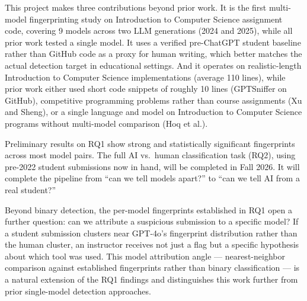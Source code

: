 \documentclass[sigconf]{acmart}
\begin{document}
This project makes three contributions beyond prior work. It is the first multi-model fingerprinting study on Introduction to Computer Science assignment code, covering 9 models across two LLM generations (2024 and 2025), while all prior work tested a single model. It uses a verified pre-ChatGPT student baseline rather than GitHub code as a proxy for human writing, which better matches the actual detection target in educational settings. And it operates on realistic-length Introduction to Computer Science implementations (average 110 lines), while prior work either used short code snippets of roughly 10 lines (GPTSniffer on GitHub), competitive programming problems rather than course assignments (Xu and Sheng), or a single language and model on Introduction to Computer Science programs without multi-model comparison (Hoq et al.).

Preliminary results on RQ1 show strong and statistically significant fingerprints across most model pairs. The full AI vs.\ human classification task (RQ2), using pre-2022 student submissions now in hand, will be completed in Fall 2026. It will complete the pipeline from ``can we tell models apart?'' to ``can we tell AI from a real student?''

Beyond binary detection, the per-model fingerprints established in RQ1 open a further question: can we attribute a suspicious submission to a specific model? If a student submission clusters near GPT-4o's fingerprint distribution rather than the human cluster, an instructor receives not just a flag but a specific hypothesis about which tool was used. This model attribution angle --- nearest-neighbor comparison against established fingerprints rather than binary classification --- is a natural extension of the RQ1 findings and distinguishes this work further from prior single-model detection approaches.


\end{document}
